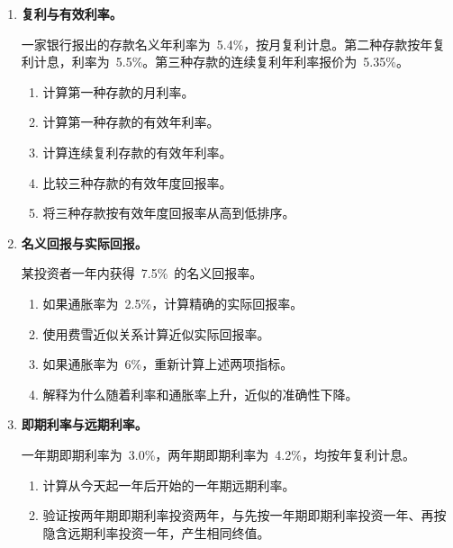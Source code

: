 \begin{enumerate}

\item \textbf{复利与有效利率。}

一家银行报出的存款名义年利率为~5.4\%，按月复利计息。第二种存款按年复利计息，利率为~5.5\%。第三种存款的连续复利年利率报价为~5.35\%。

\begin{enumerate}

\item 计算第一种存款的月利率。

\item 计算第一种存款的有效年利率。

\item 计算连续复利存款的有效年利率。

\item 比较三种存款的有效年度回报率。

\item 将三种存款按有效年度回报率从高到低排序。

\end{enumerate}

\item \textbf{名义回报与实际回报。}

某投资者一年内获得~7.5\%~的名义回报率。

\begin{enumerate}

\item 如果通胀率为~2.5\%，计算精确的实际回报率。

\item 使用费雪近似关系计算近似实际回报率。

\item 如果通胀率为~6\%，重新计算上述两项指标。

\item 解释为什么随着利率和通胀率上升，近似的准确性下降。

\end{enumerate}

\item \textbf{即期利率与远期利率。}

一年期即期利率为~3.0\%，两年期即期利率为~4.2\%，均按年复利计息。

\begin{enumerate}

\item 计算从今天起一年后开始的一年期远期利率。

\item 验证按两年期即期利率投资两年，与先按一年期即期利率投资一年、再按隐含远期利率投资一年，产生相同终值。


\end{enumerate}
\end{enumerate}
